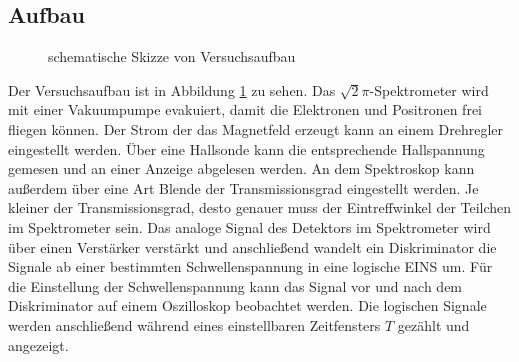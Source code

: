 \subsection{Aufbau}
\begin{figure}[h]
  \centering
  \caption{schematische Skizze von Versuchsaufbau}
  \label{fig:aufbau}
\end{figure}

Der Versuchsaufbau ist in Abbildung \ref{fig:aufbau} zu sehen. Das $\sqrt{2}\pi$-Spektrometer wird mit einer Vakuumpumpe evakuiert, damit die Elektronen und Positronen frei fliegen können. Der Strom der das Magnetfeld erzeugt kann an einem Drehregler eingestellt werden. Über eine Hallsonde kann die entsprechende Hallspannung gemesen und an einer Anzeige abgelesen werden. An dem Spektroskop kann außerdem über eine Art Blende der Transmissionsgrad eingestellt werden. Je kleiner der Transmissionsgrad, desto genauer muss der Eintreffwinkel der Teilchen im Spektrometer sein. Das analoge Signal des Detektors im Spektrometer wird über einen Verstärker verstärkt und anschließend wandelt ein Diskriminator die Signale ab einer bestimmten Schwellenspannung in eine logische EINS um. Für die Einstellung der Schwellenspannung kann das Signal vor und nach dem Diskriminator auf einem Oszilloskop beobachtet werden. Die logischen Signale werden anschließend während eines einstellbaren Zeitfensters $T$ gezählt und angezeigt.

